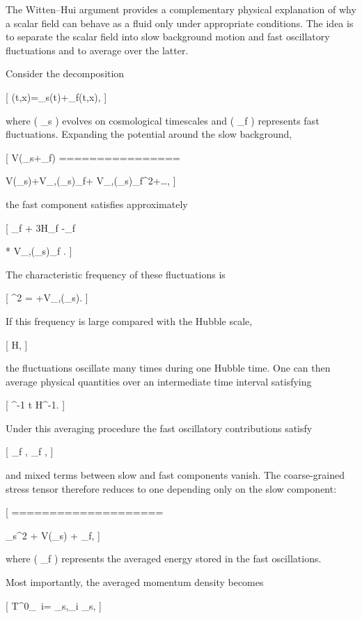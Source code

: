 The Witten–Hui argument provides a complementary physical explanation of why a scalar field can behave as a fluid only under appropriate conditions. The idea is to separate the scalar field into slow background motion and fast oscillatory fluctuations and to average over the latter.

Consider the decomposition

[
\phi(t,x)=\phi_s(t)+\phi_f(t,x),
]

where ( \phi_s ) evolves on cosmological timescales and ( \phi_f ) represents fast fluctuations. Expanding the potential around the slow background,

[
V(\phi_s+\phi_f)
================

V(\phi_s)+V_{,\phi}(\phi_s)\phi_f+ V_{,\phi\phi}(\phi_s)\phi_f^2+\dots ,
]

the fast component satisfies approximately

[
\ddot\phi_f + 3H\dot\phi_f -\phi_f

* V_{,\phi\phi}(\phi_s)\phi_f  .
  ]

The characteristic frequency of these fluctuations is

[
\omega^2 = +V_{,\phi\phi}(\phi_s).
]

If this frequency is large compared with the Hubble scale,

[
\omega \gg H,
]

the fluctuations oscillate many times during one Hubble time. One can then average physical quantities over an intermediate time interval satisfying

[
\omega^{-1} \ll \Delta t \ll H^{-1}.
]

Under this averaging procedure the fast oscillatory contributions satisfy

[
\langle \phi_f , \qquad
\langle \dot\phi_f ,
]

and mixed terms between slow and fast components vanish. The coarse-grained stress tensor therefore reduces to one depending only on the slow component:

[
\langle \rho \rangle
====================

\dot\phi_s^2 + V(\phi_s) + \rho_f,
]

where ( \rho_f ) represents the averaged energy stored in the fast oscillations.

Most importantly, the averaged momentum density becomes

[
\langle T^0_{\ i}\rangle = \dot\phi_s,\partial_i \delta\phi_s,
]

